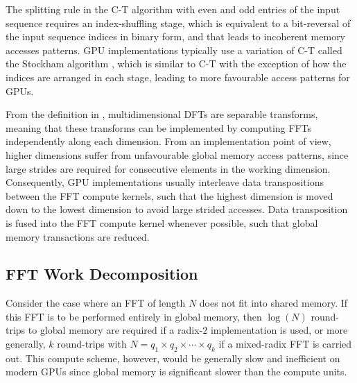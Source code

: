 \documentclass{gtac}
\theoremstyle{problemstyle}
\begin{document}
The splitting rule in the C-T algorithm with even and odd entries of the input sequence requires an index-shuffling stage, which is equivalent to a bit-reversal of the input sequence indices in binary form, and that leads to incoherent memory accesses patterns. GPU implementations typically use a variation of C-T called the Stockham algorithm \cite{gonabrdoyusmma08}, which is similar to C-T with the exception of how the indices are arranged in each stage, leading to more favourable access patterns for GPUs.

From the definition in , multidimensional DFTs are separable transforms, meaning that these transforms can be implemented by computing FFTs independently along each dimension. From an implementation point of view, higher dimensions suffer from unfavourable global memory access patterns, since large strides are required for consecutive elements in the working dimension. Consequently, GPU implementations usually interleave data transpositions between the FFT compute kernels, such that the highest dimension is moved down to the lowest dimension to avoid large strided accesses. Data transposition is fused into the FFT compute kernel whenever possible, such that global memory transactions are reduced.

\subsection{FFT Work Decomposition}

Consider the case where an FFT of length $N$ does not fit into shared memory. If this FFT is to be performed entirely in global memory, then $\log(N)$ round-trips to global memory are required if a radix-$2$ implementation is used, or more generally, $k$ round-trips with $N=q_1 \times q_2 \times \cdots \times q_k$ if a mixed-radix FFT is carried out. This compute scheme, however, would be generally slow and inefficient on modern GPUs since global memory is significant slower than the compute units. 
\end{document}

